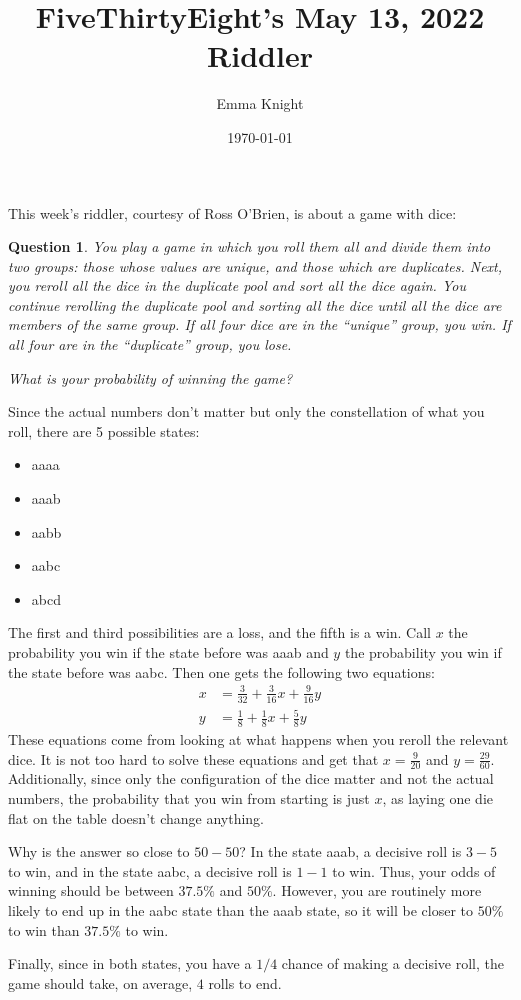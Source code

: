 \documentclass[11pt]{article}
\title{FiveThirtyEight's May 13, 2022 Riddler}
\author{Emma Knight}
\date{\today}
\newtheorem{question}[theorem]{Question}
\theoremstyle{definition}
\begin{document}
\maketitle
This week's riddler, courtesy of Ross O'Brien,  is about a game with dice:
\begin{question}
You play a game in which you roll them all and divide them into two groups: those whose values are unique, and those which are duplicates.  Next, you reroll all the dice in the duplicate pool and sort all the dice again.  You continue rerolling the duplicate pool and sorting all the dice until all the dice are members of the same group. If all four dice are in the ``unique'' group, you win. If all four are in the ``duplicate'' group, you lose.

What is your probability of winning the game?
\end{question}

Since the actual numbers don't matter but only the constellation of what you roll, there are 5 possible states:
\begin{itemize}
\item aaaa
\item aaab
\item aabb
\item aabc
\item abcd
\end{itemize}
The first and third possibilities are a loss, and the fifth is a win.  Call $x$ the probability you win if the state before was aaab and $y$ the probability you win if the state before was aabc.  Then one gets the following two equations:
\begin{align*}
x & = \frac{3}{32} + \frac{3}{16} x + \frac{9}{16} y \\
y & = \frac{1}{8} + \frac{1}{8} x + \frac{5}{8} y
\end{align*}
These equations come from looking at what happens when you reroll the relevant dice.  It is not too hard to solve these equations and get that $x = \frac{9}{20}$ and $y = \frac{29}{60}$.  Additionally, since only the configuration of the dice matter and not the actual numbers, the probability that you win from starting is just $x$, as laying one die flat on the table doesn't change anything.

Why is the answer so close to $50-50$?  In the state aaab, a decisive roll is $3-5$ to win, and in the state aabc, a decisive roll is $1-1$ to win.  Thus, your odds of winning should be between $37.5\%$ and $50\%$.  However, you are routinely more likely to end up in the aabc state than the aaab state, so it will be closer to $50\%$ to win than $37.5\%$ to win.

Finally, since in both states, you have a $1/4$ chance of making a decisive roll, the game should take, on average, $4$ rolls to end.
\end{document}
